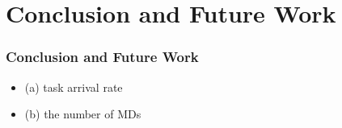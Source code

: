 \section{Conclusion and Future Work}

\begin{frame}
	\frametitle{Conclusion and Future Work}



	\begin{itemize}[]
		
		\item (a) task arrival rate
		
		\item (b) the number of MDs
		
	\end{itemize}
	
\end{frame}